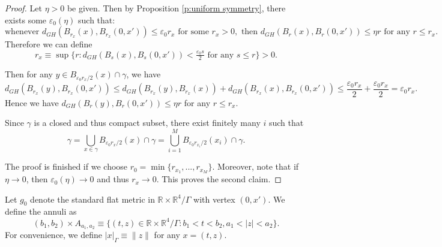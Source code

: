 \documentclass[11pt,reqno]{amsart}
\numberwithin{equation}{section}
\newcommand{\RR}{\mathds{R}}
\theoremstyle{definition}
\theoremstyle{remark}
\begin{document}
\begin{proof}
    Let $\eta>0$ be given. Then by Proposition \ref{p:uniform symmetry}, there exists some $\varepsilon_0(\eta)$ such that:
    \begin{equation*}
        \text{whenever } d_{GH}(B_{r_x}(x), B_{r_x}(0,x')) \leqslant \varepsilon_0 r_x \text{ for some } r_x>0, \text{ then } d_{GH}(B_r(x),B_r(0,x')) \leqslant \eta r \text{ for any } r\leqslant r_x. \qquad
    \end{equation*}
    Therefore we can define 
    \begin{equation*}
        r_x \equiv \sup \big\{ r: d_{GH}(B_s(x), B_s(0,x')) < \tfrac{\varepsilon_0 s}{2} \text{ for any } s \leqslant r \big\}>0.  
    \end{equation*}

    Then for any $y \in B_{\varepsilon_0 r_x/2}(x) \cap \gamma$, we have
    \begin{equation*}
        d_{GH}(B_{r_x}(y), B_{r_x}(0,x')) \leqslant d_{GH}(B_{r_x}(y), B_{r_x}(x)) + d_{GH}(B_{r_x}(x), B_{r_x}(0,x')) \leqslant \frac{\varepsilon_0 r_x}{2} + \frac{\varepsilon_0 r_x}{2} = \varepsilon_0 r_x.
    \end{equation*}
    Hence we have $d_{GH}(B_r(y),B_r(0,x')) \leqslant \eta r$ for any $r\leqslant r_x$. 

    Since $\gamma$ is a closed and thus compact subset, there exist finitely many $i$ such that 
    \begin{equation*}
        \gamma = \bigcup_{x \in \gamma} B_{\varepsilon_0 r_x /2}(x) \cap \gamma = \bigcup_{i=1}^M B_{\varepsilon_0 r_{x_i} /2}(x_i) \cap \gamma.
    \end{equation*}

    The proof is finished if we choose $r_0 = \min\{r_{x_1}, ..., r_{x_M}\}$. Moreover, note that if $\eta \to 0$, then $\varepsilon_0(\eta) \to 0$ and thus $r_x \to 0$. This proves the second claim.
    \end{proof}















Let $g_0$ denote the standard flat metric in $\RR \times \RR^4/\Gamma$ with vertex $(0,x')$. 
We define the annuli as
\begin{equation*}
    (b_1, b_2) \times  A_{a_1, a_2} \equiv \{(t, z) \in \RR \times \RR^4/\Gamma: b_1 < t < b_2,  a_1 < |z| < a_2 \}.
\end{equation*}
For convenience, we define $|x|_{\Gamma} \equiv \|z \|$ for any $x = (t,z)$.
\end{document}
